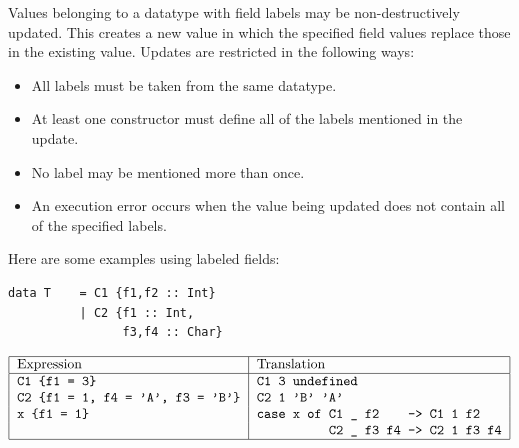Values belonging to a datatype with field labels may be
non-destructively updated.  This creates a new value in which the
specified field values replace those in the existing value.  
Updates are restricted in the following ways:
\begin{itemize}
\item All labels must be taken from the same datatype.
\item At least one constructor must define all of the labels
mentioned in the update.
\item No label may be mentioned more than once.
\item An execution error occurs when the value being updated does
not contain all of the specified labels.
\end{itemize}
Here are some examples using labeled fields:
\bprog
{\small\begin{verbatim}
data T    = C1 {f1,f2 :: Int}
          | C2 {f1 :: Int,
                f3,f4 :: Char}
\end{verbatim}}
\eprog
\[\bt{|l|l|}%
\hline
Expression                                  & Translation                       \\
\hline
\mbox{\tt C1\ {\char'173}f1\ =\ 3{\char'175}}                       & \mbox{\tt C1\ 3\ undefined}          \\
\mbox{\tt C2\ {\char'173}f1\ =\ 1,\ f4\ =\ 'A',\ f3\ =\ 'B'{\char'175}}   & \mbox{\tt C2\ 1\ 'B'\ 'A'}            \\
\mbox{\tt x\ {\char'173}f1\ =\ 1{\char'175}}                 & \mbox{\tt case\ x\ of\ C1\ {\char'137}\ f2\ \ \ \ ->\ C1\ 1\ f2} \\
                             & \mbox{\tt \ \ \ \ \ \ \ \ \ \ C2\ {\char'137}\ f3\ f4\ ->\ C2\ 1\ f3\ f4}   \\
\hline\et\]
